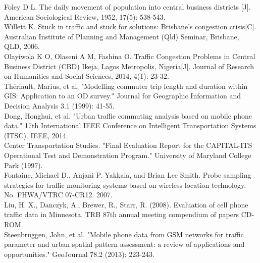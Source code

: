 \documentclass[hidelinks,12pt]{article}
\begin{document}
	\noindent Foley D L. The daily movement of population into central business districts [J]. American Sociological Review, 1952, 17(5): 538-543.\\
	
	\noindent Willett K. Stuck in traffic and stuck for solutions: Brisbane’s congestion crisis[C]. Australian Institute of Planning and Management (Qld) Seminar, Brisbane, QLD, 2006.\\
	
	\noindent Olayiwola K O, Olaseni A M, Fashina O. Traffic Congestion Problems in Central Business District (CBD) Ikeja, Lagos Metropolis, Nigeria[J]. Journal of Research on Humanities and Social Sciences, 2014, 4(1): 23-32.\\
	
	\noindent Thériault, Marius, et al. "Modelling commuter trip length and duration within GIS: Application to an OD survey." Journal for Geographic Information and Decision Analysis 3.1 (1999): 41-55.\\
	
	\noindent Dong, Honghui, et al. "Urban traffic commuting analysis based on mobile phone data." 17th International IEEE Conference on Intelligent Transportation Systems (ITSC). IEEE, 2014.\\
	
	\noindent Center Transportation Studies. "Final Evaluation Report for the CAPITAL-ITS Operational Test and Demonstration Program." University of Maryland College Park (1997).\\
	
	\noindent Fontaine, Michael D., Anjani P. Yakkala, and Brian Lee Smith. Probe sampling strategies for traffic monitoring systems based on wireless location technology. No. FHWA/VTRC 07-CR12. 2007.\\
	
	\noindent Liu, H. X., Danczyk, A., Brewer, R., Starr, R. (2008). Evaluation of cell phone traffic data in Minnesota. TRB 87th annual meeting compendium of papers CD-ROM.\\
	
	\noindent Steenbruggen, John, et al. "Mobile phone data from GSM networks for traffic parameter and urban spatial pattern assessment: a review of applications and opportunities." GeoJournal 78.2 (2013): 223-243.\\
	
	\clearpage
	\appendix
\end{document}
